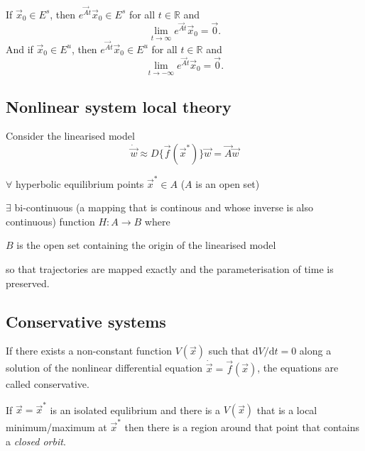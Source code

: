 \begin{theorem}
	If $\vec x_0 \in E^s$, then $e^{\vec At}\vec x_0 \in E^s$ for all $t \in \mathbb R$ and
	\begin{equation*}
		\lim_{t \to \infty} e^{\vec At} \vec x_0 = \vec 0.
	\end{equation*}
	And if $\vec x_0 \in E^u$, then $e^{\vec At}\vec x_0 \in E^u$ for all $t \in \mathbb R$ and
	\begin{equation*}
		\lim_{t \to -\infty} e^{\vec At} \vec x_0 = \vec 0.
	\end{equation*}
\end{theorem}

\subsection{Nonlinear system local theory}
Consider the linearised model
\begin{equation*}
	\dot{\vec w} \approx D\{\vec f(\vec x^\ast)\} \vec w = \vec A \vec w
\end{equation*}

\begin{theorem}
	$\forall$ hyperbolic equilibrium points $\vec x^\ast \in A$ ($A$ is an open set)

	$\exists$ bi-continuous (a mapping that is continous and whose inverse is also continuous) function $H: A \to B$ where

	$B$ is the open set containing the origin of the linearised model

	so that trajectories are mapped exactly and the parameterisation of time is preserved.
\end{theorem}

\subsection{Conservative systems}
If there exists a non-constant function $V(\vec x)$ such that $\mathrm dV / \mathrm dt = 0$ along a solution of the nonlinear differential equation $\dot{\vec x} = \vec f(\vec x)$, the equations are called conservative.

If $\vec x = \vec x^\ast$ is an isolated equlibrium and there is a $V(\vec x)$ that is a local minimum/maximum at $\vec x^\ast$ then there is a region around that point that contains a \emph{closed orbit}.